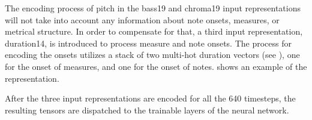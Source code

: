 
The encoding process of pitch in the \gls{bass19} and
\gls{chroma19} input representations will not take into
account any information about note onsets, measures, or
metrical structure. In order to compensate for that, a third
input representation, \gls{duration14}, is introduced to
process measure and note onsets. The process for encoding
the onsets utilizes a stack of two multi-hot duration
vectors (see ), one for the
onset of measures, and one for the onset of notes.
 shows an example of the
representation.


After the three input representations are encoded for all
the 640 timesteps, the resulting tensors are dispatched to the trainable layers of the neural network.
